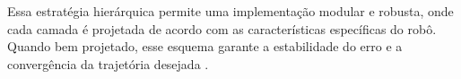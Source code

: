 Essa estratégia hierárquica permite uma implementação modular e robusta, onde cada camada é projetada de acordo com as características específicas do robô. Quando bem projetado, esse esquema garante a estabilidade do erro e a convergência da trajetória desejada \cite{Samson1995}.

